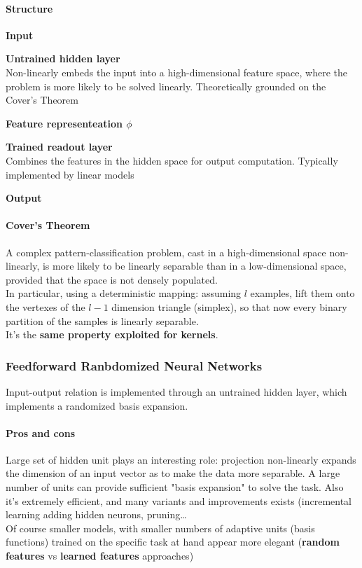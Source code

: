\documentclass[10pt]{report}
\begin{document}
\paragraph{Structure}\begin{list}{}{}
	\item \textbf{Input}
	\item \textbf{Untrained hidden layer}\\
	Non-linearly embeds the input into a high-dimensional feature space, where the problem is more likely to be solved linearly. Theoretically grounded on the Cover's Theorem
	\item \textbf{Feature representeation $\phi$}
	\item \textbf{Trained readout layer}\\
	Combines the features in the hidden space for output computation. Typically implemented by linear models
	\item \textbf{Output}
\end{list}
\paragraph{Cover's Theorem} A complex pattern-classification problem, cast in a high-dimensional space non-linearly, is more likely to be linearly separable than in a low-dimensional space, provided that the space is not densely populated.\\
In particular, using a deterministic mapping: assuming $l$ examples, lift them onto the vertexes of the $l-1$ dimension triangle (simplex), so that now every binary partition of the samples is linearly separable.\\
It's the \textbf{same property exploited for kernels}.
\subsubsection{Feedforward Ranbdomized Neural Networks} Input-output relation is implemented through an untrained hidden layer, which implements a randomized basis expansion.
\paragraph{Pros and cons} Large set of hidden unit plays an interesting role: projection non-linearly expands the dimension of an input vector as to make the data more separable. A large number of units can provide sufficient "basis expansion" to solve the task. Also it's extremely efficient, and many variants and improvements exists (incremental learning adding hidden neurons, pruning\ldots\\
Of course smaller models, with smaller numbers of adaptive units (basis functions) trained on the specific task at hand appear more elegant (\textbf{random features} vs \textbf{learned features} approaches)
\end{document}
